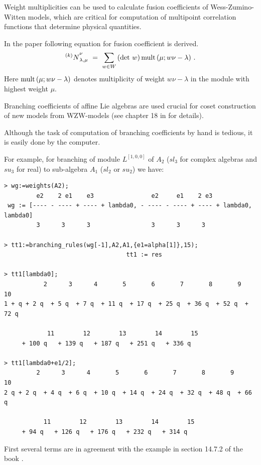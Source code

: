 \documentclass[a4paper,12pt]{article}
\theoremstyle{definition} \newtheorem{Def}{Definition}
\def\la{{\lambda}}\def\al{{\alpha}}\def\be{{\beta}}\def\ga{{\gamma}}
\def\Nk{{{ }^{(k)}N}}\def\Vk{{{ }^{(k)}V}}
\begin{document}
Weight multiplicities can be used to calculate fusion coefficients of
Wess-Zumino-Witten models, which are critical for computation of
multipoint correlation functions that determine physical quantities. 

In the paper \cite{Walton:1999xc} following equation for fusion
coefficient is derived.
\begin{equation}
  \label{eq:5}
\Nk_{\la,\mu}^\nu\ =\ \sum_{w\in W}\, (\det\,w)\, 
\mult(\mu; w\nu-\la)\ .
 \end{equation}
Here $\mult(\mu; w\nu-\la)$ denotes multiplicity of weight
$w\nu-\lambda$ in the module with highest weight $\mu$.

Branching coefficients of affine Lie algebras are used
crucial for coset construction of new models from WZW-models (see
chapter 18 in \cite{difrancesco1997cft} for details). 

Although the task of computation of branching coefficients by hand is
tedious, it is easily done by the computer.

For example, for branching of module $L^{[1,0,0]}$ of $A_2$ ($sl_3$
for complex algebras and $su_3$ for real) to sub-algebra $A_1$ ($sl_2$
or $su_2$) we have:
\begin{verbatim}
> wg:=weights(A2);
         e2    2 e1    e3                e2     e1    2 e3
 wg := [---- - ---- + ---- + lambda0, - ---- - ---- + ---- + lambda0, lambda0]
         3      3      3                 3      3      3

> tt1:=branching_rules(wg[-1],A2,A1,{e1=alpha[1]},15);
                                  tt1 := res

> tt1[lambda0];
           2      3      4       5       6       7       8       9       10
1 + q + 2 q  + 5 q  + 7 q  + 11 q  + 17 q  + 25 q  + 36 q  + 52 q  + 72 q

            11        12        13        14        15
     + 100 q   + 139 q   + 187 q   + 251 q   + 336 q  

> tt1[lambda0+e1/2];
         2      3      4       5       6       7       8       9       10
2 q + 2 q  + 4 q  + 6 q  + 10 q  + 14 q  + 24 q  + 32 q  + 48 q  + 66 q

           11        12        13        14        15
     + 94 q   + 126 q   + 176 q   + 232 q   + 314 q  
\end{verbatim}
First several terms are in agreement with the example in section
14.7.2 of the book \cite{difrancesco1997cft}.
\end{document}
